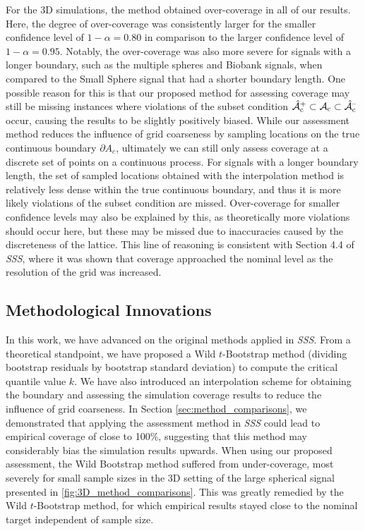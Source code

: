 For the 3D simulations, the method obtained over-coverage in all of our results. Here, the degree of over-coverage was consistently larger for the smaller confidence level of $1 - \alpha = 0.80$ in comparison to the larger confidence level of $1- \alpha = 0.95$. Notably, the over-coverage was also more severe for signals with a longer boundary, such as the multiple spheres and Biobank signals, when compared to the Small Sphere signal that had a shorter boundary length. One possible reason for this is that our proposed method for assessing coverage may still be missing instances where violations of the subset condition $\operatorname{\hat{\mathcal{A}}_{c}^+} \subset \operatorname{\mathcal{A}_{c}} \subset \operatorname{\hat{\mathcal{A}}_{c}^{\textrm{--}}}$ occur, causing the results to be slightly positively biased. While our assessment method reduces the influence of grid coarseness by sampling locations on the true continuous boundary $\partial A_c$, ultimately we can still only assess coverage at a discrete set of points on a continuous process. For signals with a longer boundary length, the set of sampled locations obtained with the interpolation method is relatively less dense within the true continuous boundary, and thus it is more likely violations of the subset condition are missed. Over-coverage for smaller confidence levels may also be explained by this, as theoretically more violations should occur here, but these may be missed due to inaccuracies caused by the discreteness of the lattice. This line of reasoning is consistent with Section 4.4 of \textit{SSS}, where it was shown that coverage approached the nominal level as the resolution of the grid was increased.

\subsection{Methodological Innovations}
\label{sec:discussion_innovations}
In this work, we have advanced on the original methods applied in \textit{SSS}. From a theoretical standpoint, we have proposed a Wild $t$-Bootstrap method (dividing bootstrap residuals by bootstrap standard deviation) to compute the critical quantile value $k$. We have also introduced an interpolation scheme for obtaining the boundary and assessing the simulation coverage results to reduce the influence of grid coarseness. In Section \ref{sec:method_comparisons}, we demonstrated that applying the assessment method in \textit{SSS} could lead to empirical coverage of close to 100\%, suggesting that this method may considerably bias the simulation results upwards. When using our proposed assessment, the Wild Bootstrap method suffered from under-coverage, most severely for small sample sizes in the 3D setting of the large spherical signal presented in \ref{fig:3D_method_comparisons}. This was greatly remedied by the Wild $t$-Bootstrap method, for which empirical results stayed close to the nominal target independent of sample size.


